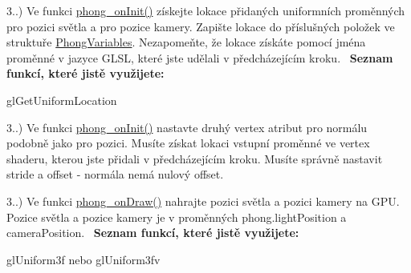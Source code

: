 \begin{DoxyRefList}
3..) Ve funkci \hyperlink{student_8h_ac2adb2ba4e748239b9db4d037584d3cc}{phong\+\_\+on\+Init()} získejte lokace přidaných uniformních proměnných pro pozici světla a pro pozice kamery. Zapište lokace do příslušných položek ve struktuře \hyperlink{structPhongVariables}{Phong\+Variables}. Nezapomeňte, že lokace získáte pomocí jména proměnné v jazyce G\+L\+S\+L, které jste udělali v předcházejícím kroku.~\newline
 {\bfseries Seznam funkcí, které jistě využijete\+:}
\begin{DoxyItemize}
\item gl\+Get\+Uniform\+Location 
\end{DoxyItemize}

3..) Ve funkci \hyperlink{student_8h_ac2adb2ba4e748239b9db4d037584d3cc}{phong\+\_\+on\+Init()} nastavte druhý vertex atribut pro normálu podobně jako pro pozici. Musíte získat lokaci vstupní proměnné ve vertex shaderu, kterou jste přidali v předcházejícím kroku. Musíte správně nastavit stride a offset -\/ normála nemá nulový offset.~\newline
 

3..) Ve funkci \hyperlink{student_8h_a53ffbb1a271d285abdaf7a029192f47e}{phong\+\_\+on\+Draw()} nahrajte pozici světla a pozici kamery na G\+P\+U. Pozice světla a pozice kamery je v proměnných phong.\+light\+Position a camera\+Position.~\newline
 {\bfseries Seznam funkcí, které jistě využijete\+:}
\begin{DoxyItemize}
\item gl\+Uniform3f nebo gl\+Uniform3fv 
\end{DoxyItemize}
\end{DoxyRefList}